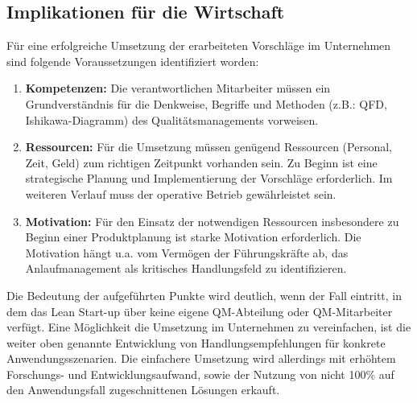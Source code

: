 \subsection*{Implikationen für die Wirtschaft}

Für eine erfolgreiche Umsetzung der erarbeiteten Vorschläge im Unternehmen sind folgende Voraussetzungen identifiziert worden: 
\begin{enumerate}
 \item \textbf{Kompetenzen: } Die verantwortlichen Mitarbeiter müssen ein Grundverständnis für die Denkweise, Begriffe und Methoden (z.B.: QFD, Ishikawa-Diagramm) des Qualitätsmanagements vorweisen. 
 \item \textbf{Ressourcen: } Für die Umsetzung müssen genügend Ressourcen (Personal, Zeit, Geld) zum richtigen Zeitpunkt vorhanden sein. Zu Beginn ist eine strategische Planung und Implementierung der Vorschläge erforderlich. Im weiteren Verlauf muss der operative Betrieb gewährleistet sein. 
 \item \textbf{Motivation: } Für den Einsatz der notwendigen Ressourcen insbesondere zu Beginn einer Produktplanung ist starke Motivation erforderlich. Die Motivation hängt u.a. vom Vermögen der Führungskräfte ab, das Anlaufmanagement als kritisches Handlungsfeld zu identifizieren. 
\end{enumerate}

Die Bedeutung der aufgeführten Punkte wird deutlich, wenn der Fall eintritt, in dem das Lean Start-up über keine eigene QM-Abteilung oder QM-Mitarbeiter verfügt. 
Eine Möglichkeit die Umsetzung im Unternehmen zu vereinfachen, ist die weiter oben genannte Entwicklung von Handlungsempfehlungen für konkrete Anwendungsszenarien. Die einfachere Umsetzung wird allerdings mit erhöhtem Forschungs- und Entwicklungsaufwand, sowie der Nutzung von nicht 100\% auf den Anwendungsfall zugeschnittenen Lösungen erkauft. 